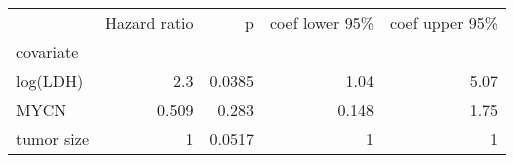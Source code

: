 \begin{tabular}{lrrrr}
\toprule
{} &  Hazard ratio &      p &  coef lower 95\% &  coef upper 95\% \\
covariate  &               &        &                  &                  \\
\midrule
log(LDH)   &           2.3 & 0.0385 &             1.04 &             5.07 \\
MYCN       &         0.509 &  0.283 &            0.148 &             1.75 \\
tumor size &             1 & 0.0517 &                1 &                1 \\
\bottomrule
\end{tabular}
